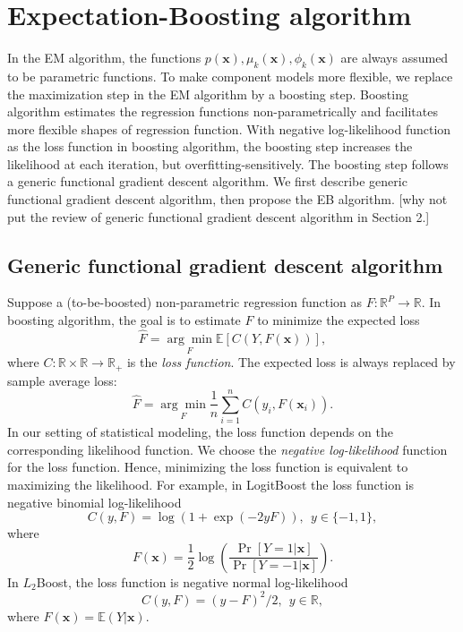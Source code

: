 \documentclass[11pt]{article}
\numberwithin{equation}{section}
\def\R{{\mathbb R}}  %
\def\E{{\mathbb E}}  %
\def\bx{\boldsymbol{x}}
\begin{document}
\section{Expectation-Boosting algorithm}\label{sec:EB}
In the EM algorithm, the functions $p(\bx), \mu_k(\bx), \phi_k(\bx)$ are always assumed to be parametric functions.
To make component models more flexible, we replace the maximization step in the EM algorithm by a boosting step.
Boosting algorithm estimates the regression functions non-parametrically and facilitates more flexible shapes of regression function.
With negative log-likelihood function as the loss function in boosting algorithm, the boosting step increases the likelihood at each iteration, but overfitting-sensitively.
The boosting step follows a generic functional gradient descent algorithm.
We first describe generic functional gradient descent algorithm, then propose the EB algorithm. {\color{blue}[why not put the review of generic functional gradient descent algorithm in Section 2.]}

\subsection{Generic functional gradient descent algorithm}

	Suppose a (to-be-boosted) {non-parametric regression function} as $F:\R^P\rightarrow\R$. In boosting algorithm, the goal is to  estimate $F$ to minimize the expected loss $$\hat{F}=\underset{F}{\arg\min}\E\left[C(Y,F(\bx))\right],$$
	where $C:\R\times\R\rightarrow\R_+$ is the \textit{loss function}.
	The expected loss is always replaced by sample average loss:
	$$\hat{F}=\underset{F}{\arg\min}\frac{1}{n}\sum_{i=1}^nC(y_i,F(\bx_i)).$$
	In our setting of statistical modeling, the loss function depends on the corresponding likelihood function.
	We choose the \textit{negative log-likelihood} function for the loss function. Hence, minimizing the loss function is equivalent to maximizing the likelihood.
For example, in LogitBoost the loss function is negative binomial log-likelihood
$$C(y,F)=\log(1+\exp(-2yF)), ~~ y\in\{-1,1\},$$
where 
\begin{equation}\label{logit-link}
F(\bx)=\frac{1}{2}\log\left(\frac{\Pr[Y=1|\bx]}{\Pr[Y=-1|\bx]}\right).
\end{equation}
In $L_2$Boost, the loss function is negative normal log-likelihood
\begin{equation}\label{l2}
	C(y,F)=(y-F)^2/2, ~~ y\in \R,
\end{equation}
where $F(\bx)=\E(Y|\bx).$
\end{document}
